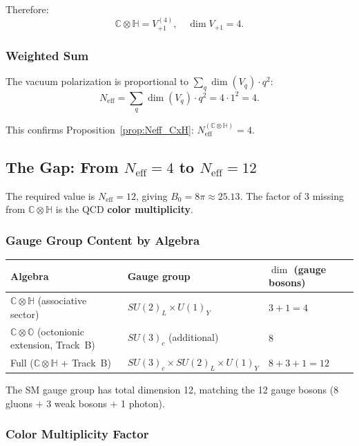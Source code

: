 \documentclass[11pt,a4paper]{article}
\newcommand{\C}{\mathbb{C}}
\renewcommand{\H}{\mathbb{H}}
\renewcommand{\O}{\mathbb{O}}
\theoremstyle{remark}
\begin{document}
Therefore:
\begin{equation}
  \C\otimes\H = V_{+1}^{(4)}, \quad \dim V_{+1} = 4.
\end{equation}

\subsubsection{Weighted Sum}

The vacuum polarization is proportional to $\sum_q \dim(V_q)\cdot q^2$:
\begin{equation}
  N_{\mathrm{eff}} = \sum_q \dim(V_q)\cdot q^2 = 4 \cdot 1^2 = 4.
  \label{eq:Neff_rep_theory}
\end{equation}

This confirms Proposition~\ref{prop:Neff_CxH}: $N_{\mathrm{eff}}^{(\C\otimes\H)} = 4$.

\subsection{The Gap: From $N_{\mathrm{eff}} = 4$ to $N_{\mathrm{eff}} = 12$}

The required value is $N_{\mathrm{eff}} = 12$, giving $B_0 = 8\pi \approx 25.13$.
The factor of 3 missing from $\C\otimes\H$ is the QCD \textbf{color multiplicity}.

\subsubsection{Gauge Group Content by Algebra}

\begin{center}
\begin{tabular}{lll}
  \toprule
  Algebra & Gauge group & $\dim$ (gauge bosons) \\
  \midrule
  $\C\otimes\H$ (associative sector) & $SU(2)_L \times U(1)_Y$ & $3 + 1 = 4$ \\
  $\C\otimes\O$ (octonionic extension, Track~B) & $SU(3)_c$ (additional) & $8$ \\
  Full ($\C\otimes\H$ + Track~B) & $SU(3)_c \times SU(2)_L \times U(1)_Y$ & $8+3+1 = 12$ \\
  \bottomrule
\end{tabular}
\end{center}

The SM gauge group has total dimension 12, matching the 12 gauge bosons
(8 gluons $+$ 3 weak bosons $+$ 1 photon).

\subsubsection{Color Multiplicity Factor}
\end{document}
